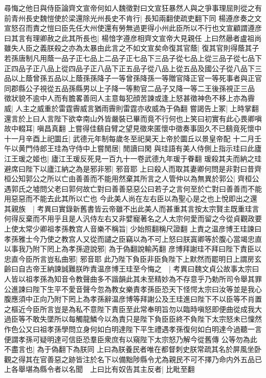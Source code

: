 尋悔之他日與侍臣論齊文宣帝何如人魏徵對曰文宣狂暴然人與之爭事理屈則從之有前青州長史魏愷使於梁還除光州長史不肯行|{
	長知兩翻使疏吏翻下同}
楊遵彦奏之文宣怒召而責之愷曰臣先任大州使還有勞無過更得小州此臣所以不行也文宣顧謂遵彦曰其言有理卿赦之此其所長也|{
	楊愔字遵彦相齊文宣帝大見親任}
上曰然曏者盧祖尚雖失人臣之義朕殺之亦為太暴由此言之不如文宣矣命復其官蔭|{
	復其官則得蔭其子若孫唐制凡用蔭一品子正七品上二品子正七品下三品子從七品上從三品子從七品下正四品子正八品上從四品子正八品下正五品子從八品上從五品及國公子從八品下三品以上蔭曾孫五品以上蔭孫孫降子一等曾孫降孫一等贈官降正官一等死事者與正官同郡縣公子視從五品孫縣男以上子降一等勲官二品子又降一等二王後孫視正三品}
徵狀貌不逾中人而有膽畧善囘人主意每犯顔苦諫或逢上怒甚徵神色不移上亦為霽威|{
	人主之威重於雷霆霽威言猶雨霽則雷霆亦收威為于偽翻}
嘗謁告上冢|{
	上時掌翻}
還言於上曰人言陛下欲幸南山外皆嚴裝已畢而竟不行何也上笑曰初實有此心畏卿嗔故中輟耳|{
	嗔昌真翻}
上嘗得佳鷂自臂之望見徵來匿懷中徵奏事固久不已鷂竟死懷中　十一月辛酉上祀圜丘|{
	武德元年制每歲冬至祀昊天上帝於圜丘以景皇帝配}
十二月壬午以黄門侍郎王珪為守侍中上嘗閒居|{
	閒讀曰閑}
與珪語有美人侍側上指示珪曰此廬江王瑗之姬也|{
	廬江王瑗反死見一百九十一卷武德九年瑗于眷翻}
瑗殺其夫而納之珪避席曰陛下以廬江納之為是邪非邪|{
	邪音耶}
上曰殺人而取其妻卿何問是非對曰昔齊桓公知郭公之所以亡由善善而不能用然棄其所言之人管仲以為無異於郭公|{
	齊桓公遇郭氏之墟問父老曰郭何故亡對曰善善惡惡公曰若子之言何至於亡對曰善善而不能用惡惡而不能去此其所以亡也}
今此美人尚在左右臣以為聖心是之也上悅即出之還其親族　|{
	考異曰實錄新舊書皆云帝雖不出此美人而甚重其言按太宗賢主既重珪言何得反棄而不用乎且是人汎侍左右又非嬖寵著名之人太宗何愛而留之今從貞觀政要}
上使太常少卿祖孝孫教宫人音樂不稱旨|{
	少始照翻稱尺證翻}
上責之温彦博王珪諫曰孝孫雅士今乃使之教宫人又從而譴之臣竊以為不可上怒曰朕寘卿等於腹心當竭忠直以事我乃附下罔上為孝孫遊說邪|{
	為于偽翻說輸芮翻}
彦博拜謝珪不拜曰陛下責臣以忠直今臣所言豈私曲邪|{
	邪音耶}
此乃陛下負臣非臣負陛下上默然而罷明日上謂房玄齡曰自古帝王納諫誠難朕昨責温彦博王珪至今悔之　|{
	考異曰魏文貞公故事太宗曰人皆以祖孝孫為知音令教聲曲多不諧韻此其未至精妙為不存意乎乃勅所司令舉其罪公進諫曰陛下生平不愛音聲今忽為教女樂責孝孫臣恐天下怪愕太宗曰汝等並是我心腹應須中正向乃附下罔上為孝孫辭温彦博等拜謝公及王珪進曰陛下不以臣等不肖置之樞近今臣所言豈是為私不意陛下責臣至此常奉明旨勿以臨時嗔怒即便曲從成我大過臣等不敢失墜所以每觸龍鱗今以為責只是陛下負臣臣終不負陛下太宗怒未已懍然作色公又曰祖孝孫學問立身何如白明達陛下平生禮遇孝孫復何如白明達今過聽一言便謂孝孫可疑明達可信臣恐羣臣衆庶有以窺陛下太宗怒乃解今從舊傳}
公等勿為此不盡言也|{
	為于偽翻下為朕同}
上曰為朕養民者唯在都督刺史朕常疏其名於屏風坐卧觀之得其在官善惡之跡皆注於名下以備黜陟縣令尤為親民不可不擇乃命内外五品已上各舉堪為縣令者以名聞　上曰比有奴告其主反者|{
	比毗至翻}
